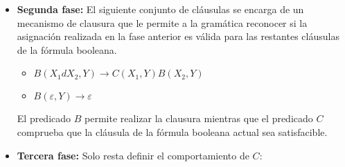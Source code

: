 \documentclass[12pt]{article}
\begin{document}
\begin{itemize}
    \item \textbf{Segunda fase:} El siguiente conjunto de cláusulas se encarga de un mecanismo de clausura que le permite a la gramática
          reconocer si la asignación realizada en la fase anterior es válida para las restantes cláusulas de la fórmula
          booleana.
          \begin{itemize}
              \item $B(X_1dX_2,Y)\to C(X_1,Y) B(X_2,Y)$
              \item $B(\varepsilon,Y)\to\varepsilon$
          \end{itemize}
          
          El predicado $B$ permite realizar la clausura mientras que el predicado $C$ comprueba que la cláusula de la fórmula
          booleana actual sea satisfacible.
          
    \item \textbf{Tercera fase:} Solo resta definir el comportamiento de $C$:
          \begin{itemize}
          \end{itemize}
          

\end{itemize}
\end{document}
